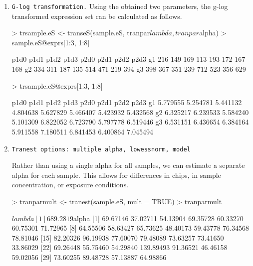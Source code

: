 \documentclass[11pt]{article}
\begin{document}
\begin{enumerate}
   
\item {\tt G-log transformation.} Using the obtained two parameters, the g-log transformed
expression set can be calculated as follows.
\begin{Schunk}
\begin{Sinput}
> trsample.eS <- transeS(sample.eS, tranpar$lambda, tranpar$alpha)
> sample.eS@exprs[1:3, 1:8]
\end{Sinput}
\begin{Soutput}
   p1d0 p1d1 p1d2 p1d3 p2d0 p2d1 p2d2 p2d3
g1  216  149  169  113  193  172  167  168
g2  334  311  187  135  514  471  219  394
g3  398  367  351  239  712  523  356  629
\end{Soutput}
\begin{Sinput}
> trsample.eS@exprs[1:3, 1:8]
\end{Sinput}
\begin{Soutput}
       p1d0     p1d1     p1d2     p1d3     p2d0     p2d1     p2d2     p2d3
g1 5.779555 5.254781 5.441132 4.804638 5.627829 5.466407 5.423932 5.432568
g2 6.325217 6.239533 5.584240 5.101309 6.822052 6.723790 5.797778 6.519446
g3 6.531151 6.436654 6.384164 5.911558 7.180511 6.841453 6.400864 7.045494
\end{Soutput}
\end{Schunk}


\item {\tt Tranest options: multiple alpha, lowessnorm, model}

Rather than using a single alpha for all samples, we can estimate a separate alpha for each sample. This allows for differences in chips, in sample concentration, or exposure conditions. 

\begin{Schunk}
\begin{Sinput}
> tranparmult <- tranest(sample.eS, mult = TRUE)
> tranparmult
\end{Sinput}
\begin{Soutput}
$lambda
[1] 689.2819

$alpha
 [1]  69.67146  37.02711  54.13904  69.35728  60.33270  60.75301  71.72965
 [8]  64.55506  58.63427  65.73625  48.40173  59.43778  76.34568  78.81046
[15]  82.20326  96.19938  77.60070  79.48089  73.63257  73.41650  33.86029
[22]  69.26448  55.75460  54.29840 139.89493  91.36521  46.46158  59.02056
[29]  73.60255  89.48728  57.13887  64.98866
\end{Soutput}
\end{Schunk}



\end{enumerate}
\end{document}
